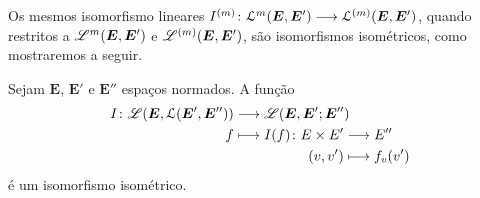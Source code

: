 Os mesmos isomorfismo lineares ${I^{(m)}}\colon {\mathcal{L}^m(\bm E, \bm E')} \longrightarrow {\mathcal{L}^{(m)}(\bm E, \bm E')}$, quando restritos a $\mathscr{L}^m(\bm E, \bm E')$ e $\mathscr{L}^{(m)}(\bm E, \bm E')$, são isomorfismos isométricos, como mostraremos a seguir.

\begin{proposition}
\label{prop:isometria.espacolinear.espacobilinear}
Sejam $\bm E$, $\bm E'$ e $\bm E''$ espaços normados. A função
\begin{align*}
	\func{I}{\toplin(\bm E,\lin(\bm E',\bm E''))}{\toplin(\bm E,\bm E';\bm E'')}{f}{
		\begin{aligned}[t]
		\func{I(f)}{E \times E'}{E''}{(v,v')}{f_v(v')}
		\end{aligned}
	}
	\end{align*}
é um isomorfismo isométrico.
\end{proposition}

